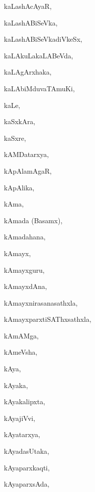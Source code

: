 \begin{multicols}{3}
{\noindent
{kaLashAcAyaR}, \pageref{kaLashAcAyaR}

\noindent
{kaLashABiSeVka}, \pageref{kaLashABiSeVka}

\noindent
{kaLashABiSeVkadiVkeSx}, \pageref{kaLashABiSeVkadiVkeSx}

\noindent
{kaLAkuLakaLABeVda}, \pageref{kaLAkuLakaLABeVda}

\noindent
{kaLAgArxhaka}, \pageref{kaLAgArxhaka}

\noindent
{kaLAbiMduvaTAmuKi}, \pageref{kaLAbiMduvaTAmuKi}

\noindent
{kaLe}, \pageref{kaLe}

\noindent
{kaSxkAra}, \pageref{kaSxkAra}

\noindent
{kaSxre}, \pageref{kaSxre}

\noindent
{kAMDatarxya}, \pageref{kAMDatarxya}

\noindent
{kApAlamAgaR}, \pageref{kApAlamAgaR}

\noindent
{kApAlika}, \pageref{kApAlika}

\noindent
{kAma}, \pageref{kAma}

\noindent
{kAmada (Basamx)}, \pageref{kAmada (Basamx)}

\noindent
{kAmadahana}, \pageref{kAmadahana}

\noindent
{kAmayx}, \pageref{kAmayx}

\noindent
{kAmayxguru}, \pageref{kAmayxguru}

\noindent
{kAmayxdAna}, \pageref{kAmayxdAna}

\noindent
{kAmayxnirasanasathxla}, \pageref{kAmayxnirasanasathxla}

\noindent
{kAmayxparxtiSAThxsathxla}, \pageref{kAmayxparxtiSAThxsathxla}

\noindent
{kAmAMga}, \pageref{kAmAMga}

\noindent
{kAmeVsha}, \pageref{kAmeVsha}

\noindent
{kAya}, \pageref{kAya}

\noindent
{kAyaka}, \pageref{kAyaka}

\noindent
{kAyakalipxta}, \pageref{kAyakalipxta}

\noindent
{kAyajiVvi}, \pageref{kAyajiVvi}

\noindent
{kAyatarxya}, \pageref{kAyatarxya}

\noindent
{kAyadasUtaka}, \pageref{kAyadasUtaka}

\noindent
{kAyaparxkaqti}, \pageref{kAyaparxkaqti}

\noindent
{kAyaparxsAda}, \pageref{kAyaparxsAda}

}
\end{multicols}
